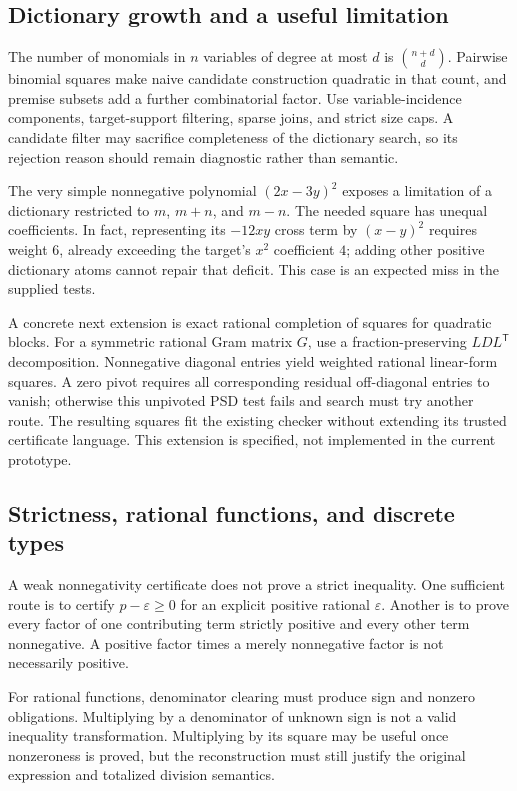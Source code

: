 \documentclass[11pt,a4paper]{article}
\begin{document}
\subsection{Dictionary growth and a useful limitation}

The number of monomials in $n$ variables of degree at most $d$ is $\binom{n+d}{d}$. Pairwise binomial squares make naive candidate construction quadratic in that count, and premise subsets add a further combinatorial factor. Use variable-incidence components, target-support filtering, sparse joins, and strict size caps. A candidate filter may sacrifice completeness of the dictionary search, so its rejection reason should remain diagnostic rather than semantic.

The very simple nonnegative polynomial $(2x-3y)^2$ exposes a limitation of a dictionary restricted to $m$, $m+n$, and $m-n$. The needed square has unequal coefficients. In fact, representing its $-12xy$ cross term by $(x-y)^2$ requires weight $6$, already exceeding the target's $x^2$ coefficient $4$; adding other positive dictionary atoms cannot repair that deficit. This case is an expected miss in the supplied tests.

A concrete next extension is exact rational completion of squares for quadratic blocks. For a symmetric rational Gram matrix $G$, use a fraction-preserving $LDL^{\mathsf T}$ decomposition. Nonnegative diagonal entries yield weighted rational linear-form squares. A zero pivot requires all corresponding residual off-diagonal entries to vanish; otherwise this unpivoted PSD test fails and search must try another route. The resulting squares fit the existing checker without extending its trusted certificate language. This extension is specified, not implemented in the current prototype.

\subsection{Strictness, rational functions, and discrete types}

A weak nonnegativity certificate does not prove a strict inequality. One sufficient route is to certify $p-\varepsilon\geq0$ for an explicit positive rational $\varepsilon$. Another is to prove every factor of one contributing term strictly positive and every other term nonnegative. A positive factor times a merely nonnegative factor is not necessarily positive.

For rational functions, denominator clearing must produce sign and nonzero obligations. Multiplying by a denominator of unknown sign is not a valid inequality transformation. Multiplying by its square may be useful once nonzeroness is proved, but the reconstruction must still justify the original expression and totalized division semantics.
\end{document}
